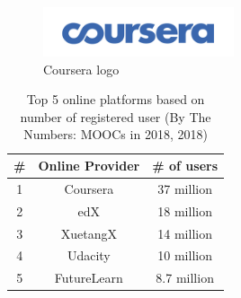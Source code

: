\documentclass[11]{article}
\begin{document}
\begin{figure}[H]

	\begin{center}
		\includegraphics[width = 0.5\textwidth]{courseraLogo.png}
	\end{center}
	
	\caption{Coursera logo}
	\label{courseraLogo}

\end{figure}

\begin{table}[H]
	\centering
	\begin{tabular}{|c|c|c|}
		\hline
		\textbf{\#} & \textbf{Online Provider} & \textbf{\# of users} \\
		\hline
		1 & Coursera & 37 million \\
		\hline
		2 & edX      & 18 million \\
		\hline
		3 & XuetangX & 14 million \\
		\hline
		4 & Udacity & 10 million \\
		\hline
		5 & FutureLearn & 8.7 million \\
		\hline
	\end{tabular}

	\caption{Top 5 online platforms based on number of registered user (By The Numbers: MOOCs in 2018, 2018)}
	\label{top5}

\end{table}
\end{document}
